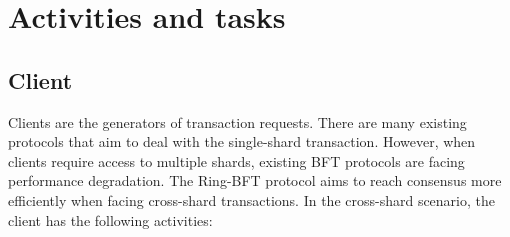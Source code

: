 \section{Activities and tasks}

\subsection{Client}

\par Clients are the generators of transaction requests. There are many existing protocols that aim
to deal with the single-shard transaction. However, when clients require access to multiple
shards, existing BFT protocols are facing performance degradation. The Ring-BFT protocol
aims to reach consensus more efficiently when facing cross-shard transactions.
In the cross-shard scenario, the client has the following activities:
